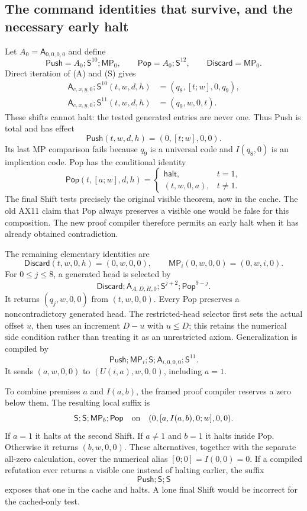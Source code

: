 \subsection{The command identities that survive, and the necessary early halt}

Let $A_0=\mathsf A_{0,0,0,0}$ and define
\[
 \mathsf{Push}=A_0;\mathsf S^{10};\mathsf{MP}_0,
 \qquad
 \mathsf{Pop}=A_0;\mathsf S^{12},
 \qquad
 \mathsf{Discard}=\mathsf{MP}_0.
\]
Direct iteration of (A) and (S) gives
\[
 \begin{aligned}
 \mathsf A_{c,x,y,0};\mathsf S^{10}(t,w,d,h)
      &=(q_8,[t;w],0,q_9),\\
 \mathsf A_{c,x,y,0};\mathsf S^{11}(t,w,d,h)
      &=(q_9,w,0,t).
 \end{aligned}
\]
These shifts cannot halt: the tested generated entries are never one.
Thus Push is total and has effect
\[
       \mathsf{Push}(t,w,d,h)=(0,[t;w],0,0).
\]
Its last MP comparison fails because $q_9$ is a universal code and
$I(q_8,0)$ is an implication code. Pop has the conditional identity
\[
 \mathsf{Pop}(t,[a;w],d,h)=
 \begin{cases}
   \mathsf{halt},&t=1,\\
   (t,w,0,a),&t\ne1.
 \end{cases}
 \tag{Pop}
\]
The final Shift tests precisely the original visible theorem, now in the
cache. The old AX11 claim that Pop always preserves a visible one would
be false for this composition. The new proof compiler therefore permits
an early halt when it has already obtained contradiction.

The remaining elementary identities are
\[
 \mathsf{Discard}(t,w,0,h)=(0,w,0,0),
 \qquad
 \mathsf{MP}_i(0,w,0,0)=(0,w,i,0).
\]
For $0\leq j\leq8$, a generated head is selected by
\[
 \mathsf{Discard};\mathsf A_{A,D,H,0};
     \mathsf S^{j+2};\mathsf{Pop}^{9-j}.
\]
It returns $(q_j,w,0,0)$ from $(t,w,0,0)$. Every Pop preserves a
noncontradictory generated head. The restricted-head selector first
sets the actual offset $u$, then uses an increment $D-u$ with $u\leq D$;
this retains the numerical side condition rather than treating it as
an unrestricted axiom. Generalization is compiled by
\[
 \mathsf{Push};\mathsf{MP}_i;\mathsf S;
       \mathsf A_{i,0,0,0};\mathsf S^{11}.
\]
It sends $(a,w,0,0)$ to $(U(i,a),w,0,0)$, including $a=1$.

To combine premises $a$ and $I(a,b)$, the framed proof compiler
reserves a zero below them. The resulting local suffix is
\[
 \mathsf S;\mathsf S;\mathsf{MP}_b;\mathsf{Pop}
 \quad\hbox{on}\quad
 (0,[a,I(a,b),0;w],0,0).
\]
If $a=1$ it halts at the second Shift. If $a\ne1$ and $b=1$ it halts
inside Pop. Otherwise it returns $(b,w,0,0)$. These alternatives,
together with the separate all-zero calculation, cover the numerical
alias $[0;0]=I(0,0)=0$. If a compiled refutation ever returns a visible
one instead of halting earlier, the suffix
\[
                         \mathsf{Push};\mathsf S;\mathsf S
\]
exposes that one in the cache and halts. A lone final Shift would be
incorrect for the cached-only test.

